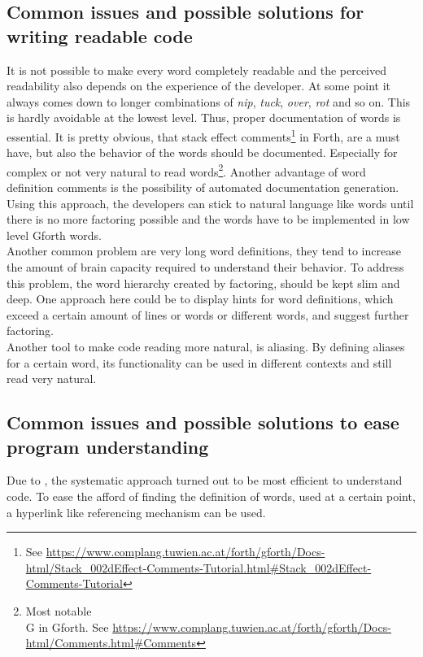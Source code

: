 \subsection{Common issues and possible solutions for writing readable code}

It is not possible to make every word completely readable and the perceived readability also depends on the experience of the developer. At some point  it always comes down to longer combinations of \emph{nip}, \emph{tuck}, \emph{over}, \emph{rot} and so on. This is hardly avoidable at the lowest level. Thus, proper documentation of words is essential. It is pretty obvious, that stack effect comments\footnote{See \url{https://www.complang.tuwien.ac.at/forth/gforth/Docs-html/Stack\_002dEffect-Comments-Tutorial.html\#Stack\_002dEffect-Comments-Tutorial}} in Forth, are a must have, but also the behavior of the words should be documented. Especially for complex or not very natural to read words\footnote{Most notable \\G in Gforth. See \url{https://www.complang.tuwien.ac.at/forth/gforth/Docs-html/Comments.html\#Comments}}. Another advantage of word definition comments is the possibility of automated documentation generation.\\
Using this approach, the developers can stick to natural language like words until there is no more factoring possible and the words have to be implemented in low level Gforth words.
\\
Another common problem are very long word definitions, they tend to increase the amount of brain capacity required to understand their behavior. To address this problem, the word hierarchy created by factoring, should be kept slim and deep. One approach here could be to display hints for word definitions, which exceed a certain amount of lines or words or different words, and suggest further factoring.
\\
Another tool to make code reading more natural, is aliasing. By defining aliases for a certain word, its functionality can be used in different contexts and still read very natural.

\subsection{Common issues and possible solutions to ease program understanding}

Due to \cite{Robillard:2004:EDI:1042203.1042417}, the systematic approach turned out to be most efficient to understand code. To ease the afford of finding the definition of words, used at a certain point, a hyperlink like referencing mechanism can be used.

